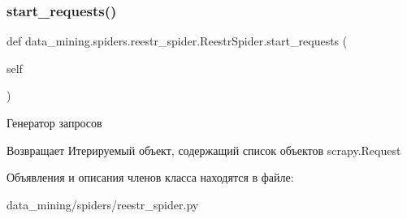\subsubsection{\texorpdfstring{start\+\_\+requests()}{start\_requests()}}
{\footnotesize\ttfamily def data\+\_\+mining.\+spiders.\+reestr\+\_\+spider.\+Reestr\+Spider.\+start\+\_\+requests (\begin{DoxyParamCaption}\item[{}]{self }\end{DoxyParamCaption})}



Генератор запросов 

\begin{DoxyReturn}{Возвращает}
Итерируемый объект, содержащий список объектов scrapy.\+Request 
\end{DoxyReturn}


Объявления и описания членов класса находятся в файле\+:\begin{DoxyCompactItemize}
\item 
data\+\_\+mining/spiders/reestr\+\_\+spider.\+py\end{DoxyCompactItemize}
